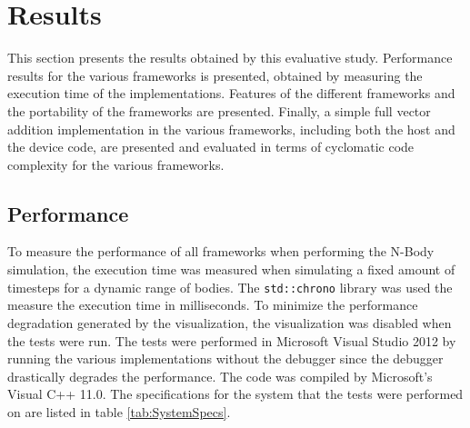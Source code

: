 
\chapter{Results}

This section presents the results obtained by this evaluative study. Performance results for the various frameworks is presented, obtained by measuring the execution time of the implementations. Features of the different frameworks and the portability of the frameworks are presented. Finally, a simple full vector addition implementation in the various frameworks, including both the host and the device code, are presented and evaluated in terms of cyclomatic code complexity for the various frameworks.


\section{Performance}

To measure the performance of all frameworks when performing the N-Body simulation, the execution time was measured when simulating a fixed amount of timesteps for a dynamic range of bodies. The \lstinline{std::chrono} library was used the measure the execution time in milliseconds. To minimize the performance degradation generated by the visualization, the visualization was disabled when the tests were run. The tests were performed in Microsoft Visual Studio 2012 by running the various implementations without the debugger since the debugger drastically degrades the performance.
The code was compiled by Microsoft's Visual C++ 11.0. The specifications for the system that the tests were performed on are listed in table \ref{tab:SystemSpecs}.

